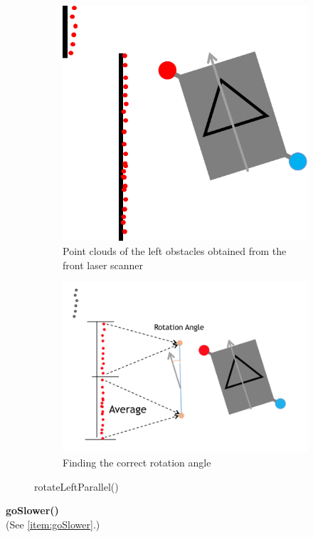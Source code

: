 \begin{description}
\begin{figure}[ht]
\centering
\begin{subfigure}{.5\textwidth}
	\centering
	\includegraphics[scale=0.65]{graphics/rotate_left_parallel01.png}
	\caption{Point clouds of the left obstacles obtained from the front laser scanner}
	\label{rotate_left_parallel01}
\end{subfigure}%
\begin{subfigure}{.5\textwidth}
	\centering
	\includegraphics[scale=0.55]{graphics/rotate_left_parallel02.png}
	\caption{Finding the correct rotation angle}
	\label{rotate_left_parallel02}
\end{subfigure}
\caption{rotateLeftParallel()}
\label{fig:side_by_side}
\end{figure}

\item \textbf{goSlower()} \hfill \\
(See \ref{item:goSlower}.) 
\end{description}



